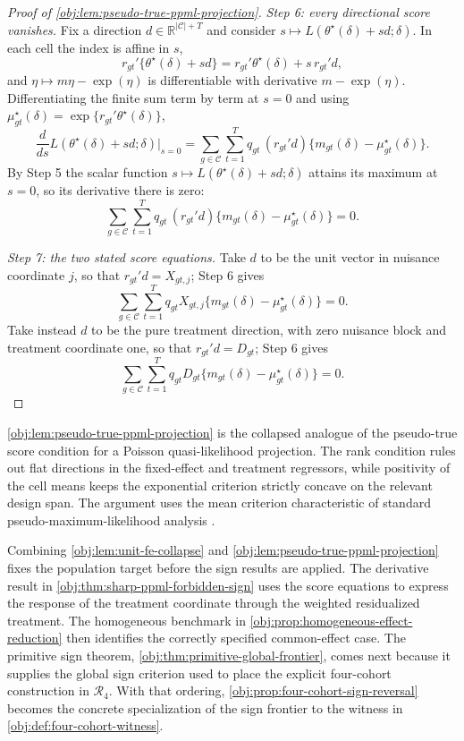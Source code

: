 \documentclass[11pt]{article}
\begin{document}
\begin{proof}[Proof of \cref{obj:lem:pseudo-true-ppml-projection}]
\textit{Step 6: every directional score vanishes.} Fix a direction \(d\in\mathbb R^{|\mathcal C|+T}\) and consider \(s\mapsto L(\theta^\star(\delta)+sd;\delta)\). In each cell the index is affine in \(s\),
\[
r_{gt}'\{\theta^\star(\delta)+sd\}=r_{gt}'\theta^\star(\delta)+s\,r_{gt}'d ,
\]
and \(\eta\mapsto m\eta-\exp(\eta)\) is differentiable with derivative \(m-\exp(\eta)\). Differentiating the finite sum term by term at \(s=0\) and using \(\mu^\star_{gt}(\delta)=\exp\{r_{gt}'\theta^\star(\delta)\}\),
\[
\frac{d}{ds}L(\theta^\star(\delta)+sd;\delta)\Big|_{s=0}
=
\sum_{g\in\mathcal C}\sum_{t=1}^T
q_{gt}\,(r_{gt}'d)\{m_{gt}(\delta)-\mu^\star_{gt}(\delta)\}.
\]
By Step 5 the scalar function \(s\mapsto L(\theta^\star(\delta)+sd;\delta)\) attains its maximum at \(s=0\), so its derivative there is zero:
\[
\sum_{g\in\mathcal C}\sum_{t=1}^T
q_{gt}\,(r_{gt}'d)\{m_{gt}(\delta)-\mu^\star_{gt}(\delta)\}=0 .
\]

\textit{Step 7: the two stated score equations.} Take \(d\) to be the unit vector in nuisance coordinate \(j\), so that \(r_{gt}'d=X_{gt,j}\); Step 6 gives
\[
\sum_{g\in\mathcal C}\sum_{t=1}^T
q_{gt}X_{gt,j}\{m_{gt}(\delta)-\mu^\star_{gt}(\delta)\}=0 .
\]
Take instead \(d\) to be the pure treatment direction, with zero nuisance block and treatment coordinate one, so that \(r_{gt}'d=D_{gt}\); Step 6 gives
\[
\sum_{g\in\mathcal C}\sum_{t=1}^T
q_{gt}D_{gt}\{m_{gt}(\delta)-\mu^\star_{gt}(\delta)\}=0 .
\]
\end{proof}

\cref{obj:lem:pseudo-true-ppml-projection} is the collapsed analogue of the pseudo-true score condition for a Poisson quasi-likelihood projection. The rank condition rules out flat directions in the fixed-effect and treatment regressors, while positivity of the cell means keeps the exponential criterion strictly concave on the relevant design span. The argument uses the mean criterion characteristic of standard pseudo-maximum-likelihood analysis \citep{White1982MisspecifiedML,GourierouxMonfortTrognon1984Poisson}.

Combining \cref{obj:lem:unit-fe-collapse} and \cref{obj:lem:pseudo-true-ppml-projection} fixes the population target before the sign results are applied. The derivative result in \cref{obj:thm:sharp-ppml-forbidden-sign} uses the score equations to express the response of the treatment coordinate through the weighted residualized treatment. The homogeneous benchmark in \cref{obj:prop:homogeneous-effect-reduction} then identifies the correctly specified common-effect case. The primitive sign theorem, \cref{obj:thm:primitive-global-frontier}, comes next because it supplies the global sign criterion used to place the explicit four-cohort construction in \(\mathcal R_4\). With that ordering, \cref{obj:prop:four-cohort-sign-reversal} becomes the concrete specialization of the sign frontier to the witness in \cref{obj:def:four-cohort-witness}.
\end{document}
